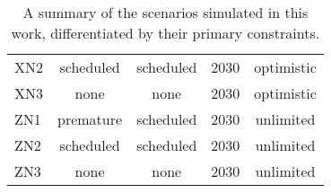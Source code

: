 \begin{table}[ht]
\begin{tabular}{lcccc}
                        XN2 & 
                        \cellcolor{orange!25}scheduled & 
                        \cellcolor{orange!25}scheduled & 
                        \cellcolor{green!25}2030 &
                        \cellcolor{green!25}optimistic\\ 
                        XN3 & 
                        \cellcolor{green!25}none & 
                        \cellcolor{green!25}none & 
                        \cellcolor{green!25}2030 &
                        \cellcolor{green!25}optimistic\\ 
                        ZN1 & 
                        \cellcolor{red!25}premature & 
                        \cellcolor{orange!25}scheduled & 
                        \cellcolor{green!25}2030 &
                        \cellcolor{orange!25}unlimited\\ 
                        ZN2 & 
                        \cellcolor{orange!25}scheduled & 
                        \cellcolor{orange!25}scheduled & 
                        \cellcolor{green!25}2030 &
                        \cellcolor{orange!25}unlimited\\ 
                        ZN3 & 
                        \cellcolor{green!25}none & 
                        \cellcolor{green!25}none & 
                        \cellcolor{green!25}2030 &
                        \cellcolor{orange!25}unlimited\\ 
                        \hline
        \end{tabular}
        \caption{A summary of the scenarios simulated in this work, 
        differentiated by their primary constraints.}
        \label{tab:scenarios}
\end{table}
